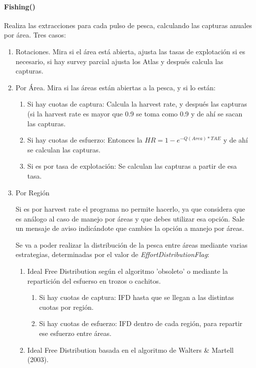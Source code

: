\documentclass[12pt, oneside, a4paper]{article}
\begin{document}
			\paragraph{Fishing()}
				Realiza las extracciones para cada pulso de pesca, calculando las capturas anuales por área. 
				Tres casos:
				\begin{enumerate}
					\item Rotaciones. Mira si el área está abierta, ajusta las tasas de explotación si es necesario, si hay survey parcial ajusta los Atlas y después calcula las capturas. 
					\item Por Área. Mira si las áreas están abiertas a la pesca, y si lo están:
						\begin{enumerate}
							\item Si hay cuotas de captura: Calcula la harvest rate, y después las capturas (si la harvest rate es mayor que 0.9 se toma como 0.9 y de ahí se sacan las capturas. 
							\item Si hay cuotas de esfuerzo: Entonces la $HR=1-e^{-Q(Area)*TAE}$ y de ahí se calculan las capturas.
							\item Si es por tasa de explotación: Se calculan las capturas a partir de esa tasa. 
						\end{enumerate}
					\item Por Región
					 \par Si es por harvest rate el programa no permite hacerlo, ya que considera que es análogo al caso de manejo por áreas y que debes utilizar esa opción. Sale un mensaje de aviso indicándote que cambies la opción a manejo por áreas.
					\par Se va a poder realizar la distribución de la pesca entre áreas mediante varias estrategias, determinadas por el valor de \emph{EffortDistributionFlag}:
					\begin{enumerate}
						\item Ideal Free Distribution según el algoritmo 'obsoleto' o mediante la repartición del esfuerso en trozos o cachitos. 
						\begin{enumerate}
							\item Si hay cuotas de captura: IFD hasta que se llegan a las distintas cuotas por región.
							\item Si hay cuotas de esfuerzo: IFD dentro de cada región, para repartir ese esfuerzo entre áreas. 	 
						\end{enumerate}
						\item Ideal Free Distribution basada en el algoritmo de Walters \& Martell (2003). 

\end{enumerate}
\end{enumerate}
\end{document}
